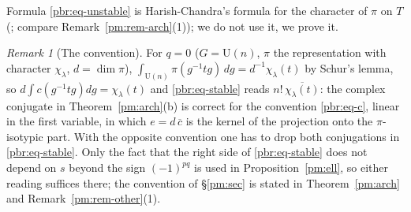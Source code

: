 \documentclass[10pt]{amsart}
\theoremstyle{definition}
\theoremstyle{remark}
\newtheorem{remark}[theorem]{Remark}
\providecommand{\auU}{\mathrm U}
\providecommand{\aubar}[1]{\overline{#1}}
\begin{document}
Formula \eqref{pbr:eq-unstable} is Harish-Chandra's formula for the character of $\pi$ on $T$
(\cite[Theorem~16, p.~96]{HC66}; compare Remark~\ref{pm:rem-arch}(1)); we do not use it, we prove it.

\begin{remark}[The convention]\label{pbr:rem-conv}
For $q=0$ ($G=\auU(n)$, $\pi$ the representation with character $\chi_\lambda$, $d=\dim\pi$),
$\int_{\auU(n)}\pi(g^{-1}tg)\,dg=d^{-1}\chi_\lambda(t)$ by Schur's lemma, so $d\int c(g^{-1}tg)dg=
\chi_\lambda(t)$ and \eqref{pbr:eq-stable} reads $n!\,\aubar{\chi_\lambda(t)}$: the complex conjugate
in Theorem~\ref{pm:arch}(b) is correct for the convention \eqref{pbr:eq-c}, linear in the first
variable, in which $e=d\,\aubar c$ is the kernel of the projection onto the $\pi$-isotypic part.
With the opposite convention one has to drop both conjugations in \eqref{pbr:eq-stable}. Only the
fact that the right side of \eqref{pbr:eq-stable} does not depend on $s$ beyond the sign
$(-1)^{pq}$ is used in Proposition~\ref{pm:ell}, so either reading suffices there; the convention of
\S\ref{pm:sec} is stated in Theorem~\ref{pm:arch} and Remark~\ref{pm:rem-other}(1).
\end{remark}
\end{document}
